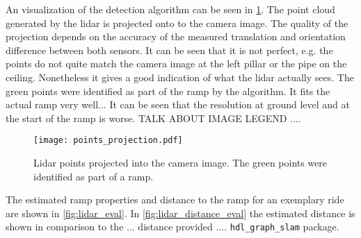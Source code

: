 
An visualization of the detection algorithm can be seen in \cref{fig:points_projection}.
The point cloud generated by the \gls{lidar} is projected onto to the camera image.
The quality of the projection depends on the accuracy of the measured translation and orientation difference between both sensors.
It can be seen that it is not perfect, e.g. the points do not quite match the camera image at the left pillar or the pipe on the ceiling.
Nonetheless it gives a good indication of what the \gls{lidar} actually sees.
The green points were identified as part of the ramp by the algorithm.
It fits the actual ramp very well...
It can be seen that the resolution at ground level and at the start of the ramp is worse.
TALK ABOUT IMAGE LEGEND
....
\begin{figure}[htbp]
	\centering
	\texttt{[image: points\_projection.pdf]}
	\caption{Lidar points projected into the camera image. The green points were identified as part of a ramp.}
	\label{fig:points_projection}
\end{figure}
The estimated ramp properties and distance to the ramp for an exemplary ride are shown in \cref{fig:lidar_eval}.
In \cref{fig:lidar_distance_eval} the estimated distance is shown in comparison to the ... distance provided .... \texttt{hdl\_graph\_slam} package.
